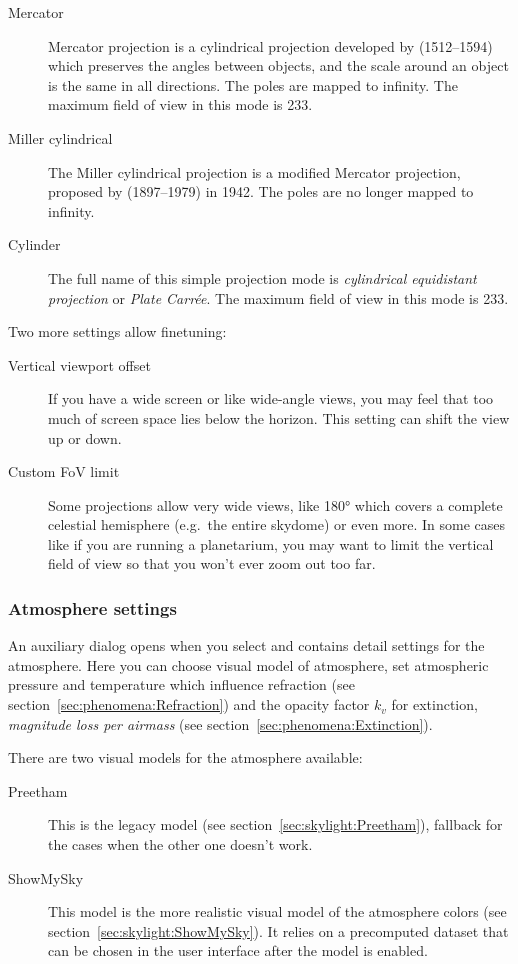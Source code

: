 \begin{description}
  \item[Mercator] Mercator projection is a cylindrical projection developed 
    by  (1512--1594)
    which preserves the angles between objects, and the scale around
    an object is the same in all directions. The poles are mapped to
    infinity.  The maximum field of view in this mode is 233\degree.
  \item[Miller cylindrical] The Miller cylindrical projection is a
    modified Mercator projection, proposed by 
    (1897--1979) in 1942. The poles are no longer mapped to
    infinity.
  \item[Cylinder] The full name of this simple projection mode is
    \emph{cylindrical equidistant projection} or \emph{Plate
      Carr\'ee}. The maximum field of view in this mode is 233\degree.
\end{description}

\noindent Two more settings allow finetuning:
\begin{description}
\item[Vertical viewport offset] If you have a wide screen or like wide-angle views,
you may feel that too much of screen space lies below the horizon. This setting can shift the view up or down.
\item[Custom FoV limit] Some projections allow very wide views, like 180°
which covers a complete  celestial hemisphere (e.g.\ the entire skydome)
or even more. In some cases like if you are running a planetarium, you may want
to limit the vertical field of view so that you won't ever zoom out too far.
\end{description}

\subsubsection{Atmosphere settings}
\label{sec:gui:view:sky:atmosphere}

An auxiliary dialog opens when you select 
and contains detail settings for the atmosphere. Here
you can choose visual model of atmosphere, set atmospheric pressure and temperature which influence
refraction (see section~\ref{sec:phenomena:Refraction}) and the
opacity factor $k_v$ for extinction, \emph{magnitude loss per airmass} 
(see section~\ref{sec:phenomena:Extinction}).

There are two visual models for the atmosphere available:
\begin{description}
  \item[Preetham] This is the legacy model (see section~\ref{sec:skylight:Preetham}), fallback for the cases
    when the other one doesn't work.
  \item[ShowMySky] This model is the more realistic visual model of
    the atmosphere colors (see section~\ref{sec:skylight:ShowMySky}). It
    relies on a precomputed dataset that can be chosen in the user
    interface after the  model is enabled.
\end{description}

